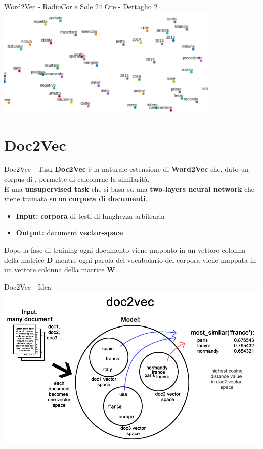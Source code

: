 \documentclass[british]{beamer}
\begin{document}
\begin{frame}{Word2Vec - RadioCor e Sole 24 Ore - Dettaglio 2}
	\includegraphics[width= 0.8\textwidth]{./Imgs/plot-anni.png}
\end{frame}

\section{Doc2Vec}

\begin{frame}{Doc2Vec - Task}
	\textbf{Doc2Vec} \`{e} la naturale estensione di \textbf{Word2Vec} che, dato un corpus di , permette di calcolarne la similarit\`{a}.\\
	\`{E} una \textbf{unsupervised task} che si basa su una \textbf{\alert{two-layers neural network}} che viene trainata su un \textbf{corpora di documenti}. 
	\begin{itemize}
		\item \textbf{Input: }\textbf{corpora} di testi di lunghezza arbitraria
		\item \textbf{Output: }document \textbf{vector-space}
	\end{itemize}	
	Dopo la fase di training ogni documento viene mappato in un vettore colonna della matrice \textbf{D} mentre ogni parola del vocabolario del corpora viene mappata in un vettore colonna della matrice \textbf{W}.	
\end{frame}

\begin{frame}{Doc2Vec - Idea}
	\includegraphics[width=\textwidth]{./Imgs/doc2vec-working.png}
\end{frame}
\end{document}

